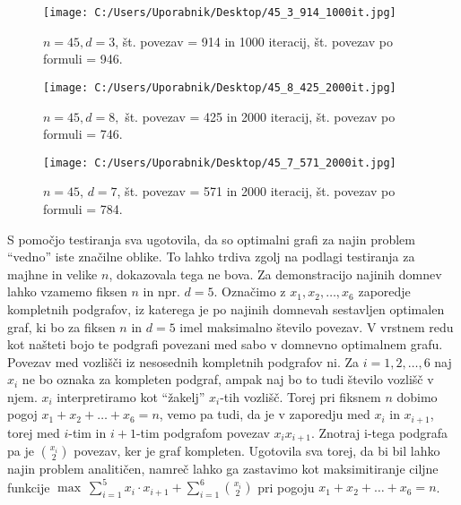 \documentclass[12pt,a4paper]{amsart}
\theoremstyle{definition} %
\theoremstyle{plain} %
\begin{document}
\begin{figure}[h]
    \centering
    \texttt{[image: C:/Users/Uporabnik/Desktop/45\_3\_914\_1000it.jpg]} 
    \caption{$n = 45, d = 3$, št. povezav = 914 in 1000 iteracij, št. povezav po formuli = 946.}
    \label{fig:slika3}
\end{figure}

\break

\begin{figure}[h]
    \centering
    \texttt{[image: C:/Users/Uporabnik/Desktop/45\_8\_425\_2000it.jpg]} 
    \caption{$n = 45, d = 8,$ št. povezav = 425 in 2000 iteracij, št. povezav po formuli = 746.}
    \label{fig:slika3}
\end{figure}

\begin{figure}[h]
    \centering
    \texttt{[image: C:/Users/Uporabnik/Desktop/45\_7\_571\_2000it.jpg]} 
    \caption{$n = 45$, $d = 7$, št. povezav = 571 in 2000 iteracij, št. povezav po formuli = 784.}
    \label{fig:slika3}
\end{figure}

\noindent S pomočjo testiranja sva ugotovila, da so optimalni grafi za najin problem \enquote{vedno} iste značilne oblike.
To lahko trdiva zgolj na podlagi testiranja za majhne in velike $n$, dokazovala tega ne bova. 
Za demonstracijo najinih domnev lahko vzamemo fiksen $n$ in npr. $d = 5$. Označimo z $ x_1, x_2, \ldots, x_6 $ zaporedje kompletnih 
podgrafov, iz katerega je po najinih domnevah sestavljen optimalen graf, ki bo za fiksen $n$ in $d = 5$ imel maksimalno število povezav.
V vrstnem redu kot našteti bojo te podgrafi povezani med sabo v domnevno optimalnem grafu. Povezav med vozlišči iz nesosednih kompletnih podgrafov ni.
Za $i = 1, 2, \ldots, 6$ naj $x_i$ ne bo oznaka za kompleten podgraf, ampak naj bo to tudi število vozlišč v njem. $x_i$ interpretiramo kot \enquote{žakelj}
$x_i$-tih vozlišč.
Torej pri fiksnem $n$ dobimo pogoj $ x_1 + x_2 + \ldots + x_6 = n $, vemo pa tudi, da je v zaporedju med $x_i$ in $x_{i+1}$, torej 
med $i$-tim in $i+1$-tim podgrafom povezav $x_ix_{i+1}$.
Znotraj i-tega podgrafa pa je $\binom{x_i}{2}$ povezav, ker je graf kompleten. Ugotovila sva torej, da bi bil lahko najin problem 
analitičen, namreč lahko ga zastavimo kot maksimitiranje ciljne funkcije $\max\ \sum_{i=1}^{5} x_i \cdot x_{i+1} + \sum_{i=1}^{6} \binom{x_i}{2} $ 
pri pogoju $ x_1 + x_2 + \ldots + x_6 = n $.
\end{document}
